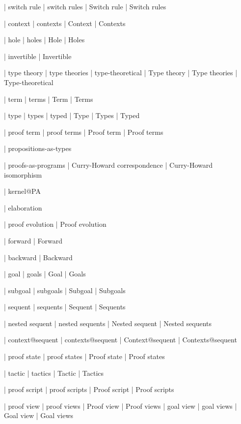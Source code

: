  | switch rule
 | switch rules
 | Switch rule
 | Switch rules
 
 | context
 | contexts
 | Context
 | Contexts

 | hole
 | holes
 | Hole
 | Holes

 | invertible
 | Invertible

 | type theory
 | type theories
 | type-theoretical
 | Type theory
 | Type theories
 | Type-theoretical

 | term
 | terms
 | Term
 | Terms

 | type
 | types
 | typed
 | Type
 | Types
 | Typed

 | proof term
 | proof terms
 | Proof term
 | Proof terms

 | propositions-as-types

 | proofs-as-programs
 | Curry-Howard correspondence
 | Curry-Howard isomorphism

 | kernel@PA

 | elaboration

 | proof evolution
 | Proof evolution

 | forward
 | Forward

 | backward
 | Backward
 
 | goal
 | goals
 | Goal
 | Goals

 | subgoal
 | subgoals
 | Subgoal
 | Subgoals

 | sequent
 | sequents
 | Sequent
 | Sequents

 | nested sequent
 | nested sequents
 | Nested sequent
 | Nested sequents

 | context@sequent
 | contexts@sequent
 | Context@sequent
 | Contexts@sequent

 | proof state
 | proof states
 | Proof state
 | Proof states

 | tactic
 | tactics
 | Tactic
 | Tactics

 | proof script
 | proof scripts
 | Proof script
 | Proof scripts

 | proof view
 | proof views
 | Proof view
 | Proof views
 | goal view
 | goal views
 | Goal view
 | Goal views

